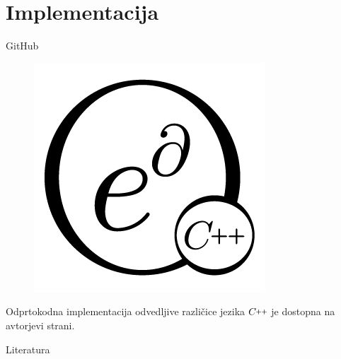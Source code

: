 \documentclass{beamer}
\newcommand{\CC}{C\nolinebreak\hspace{-.05em}\raisebox{.4ex}{\tiny\bf +}\nolinebreak\hspace{-.10em}\raisebox{.4ex}{\tiny\bf +}}
\def\CC{{C\nolinebreak[4]\hspace{-.05em}\raisebox{.4ex}{\tiny\bf ++}}}
\begin{document}
\section{Implementacija}
\begin{frame}{GitHub}
\begin{figure}[h]
\centering
\includegraphics[width=0.5\linewidth]{edCpplogo.png}
\end{figure}
Odprtokodna implementacija odvedljive različice jezika $\CC$ je dostopna na avtorjevi strani. \cite{dC++Man,dC++}
\end{frame}

\begin{frame}{Literatura}


\end{frame}
\end{document}
